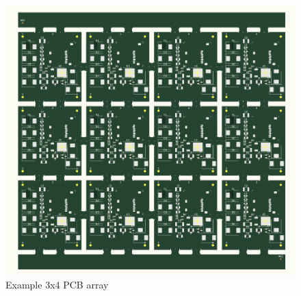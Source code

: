 \documentclass[a4paper,10pt]{report}
\begin{document}
\begin{figure}[!htb]
 \centering
 \includegraphics[width=1\textwidth]{images/panel_mini_a4.png}
 \caption{Example 3x4 PCB array}
\end{figure}
\end{document}
